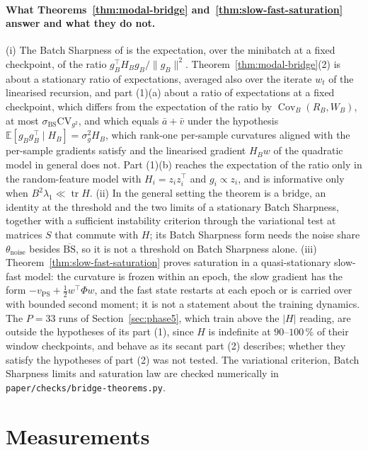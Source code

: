 \documentclass[11pt]{article}
\theoremstyle{remark}
\newcommand{\E}{\mathbb{E}}
\newcommand{\tr}{\operatorname{tr}}
\begin{document}
\paragraph{What Theorems~\ref{thm:modal-bridge} and~\ref{thm:slow-fast-saturation} answer and what they do not.} (i) The Batch Sharpness of \citet[Definition~3.1]{andreyev2026momentum} is the expectation, over the minibatch at a fixed checkpoint, of the ratio $g_B^\top H_Bg_B/\|g_B\|^2$. Theorem~\ref{thm:modal-bridge}(2) is about a stationary ratio of expectations, averaged also over the iterate $w_t$ of the linearised recursion, and part (1)(a) about a ratio of expectations at a fixed checkpoint, which differs from the expectation of the ratio by $\operatorname{Cov}_B(R_B,W_B)$, at most $\sigma_{\mathrm{BS}}\mathrm{CV}_{g^2}$, and which equals $\bar a+\bar v$ under the hypothesis $\E[g_Bg_B^\top\mid H_B]=\sigma_g^2H_B$, which rank-one per-sample curvatures aligned with the per-sample gradients satisfy and the linearised gradient $H_Bw$ of the quadratic model in general does not. Part (1)(b) reaches the expectation of the ratio only in the random-feature model with $H_i=z_iz_i^\top$ and $g_i\propto z_i$, and is informative only when $B^2\lambda_1\ll\tr H$. (ii) In the general setting the theorem is a bridge, an identity at the threshold and the two limits of a stationary Batch Sharpness, together with a sufficient instability criterion through the variational test at matrices $S$ that commute with $H$; its Batch Sharpness form needs the noise share $\theta_{\mathrm{noise}}$ besides $\overline{\mathrm{BS}}$, so it is not a threshold on Batch Sharpness alone. (iii) Theorem~\ref{thm:slow-fast-saturation} proves saturation in a quasi-stationary slow-fast model: the curvature is frozen within an epoch, the slow gradient has the form $-v_{\mathrm{PS}}+\frac12w^\top\Phi w$, and the fast state restarts at each epoch or is carried over with bounded second moment; it is not a statement about the training dynamics. The $P=33$ runs of Section~\ref{sec:phase5}, which train above the $|H|$ reading, are outside the hypotheses of its part (1), since $H$ is indefinite at $90$--$100\,\%$ of their window checkpoints, and behave as its secant part (2) describes; whether they satisfy the hypotheses of part (2) was not tested. The variational criterion, Batch Sharpness limits and saturation law are checked numerically in \texttt{paper/checks/bridge-theorems.py}.

\section{Measurements}\label{sec:exp}
\end{document}
